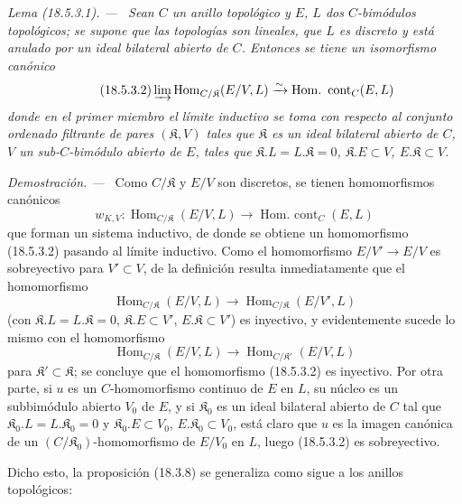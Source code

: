 \documentclass[10pt,oneside]{book}
\makeatletter
\newcommand{\setmanualcurrentlabel}[1]{\def\@currentlabel{#1}}
\newenvironment{lemma}[1][]{%
  \setmanualcurrentlabel{#1}\par\medskip\noindent\itshape Lema (#1). ---\ }{\par}
\newenvironment{proof}{%
  \par\medskip\noindent\textit{Demostración. ---\ }}{\par}
\makeatother
\begin{document}
\begin{lemma}[18.5.3.1]
\label{0.18.5.3.1-es}
Sean $C$ un anillo topológico y $E$, $L$ dos $C$-bimódulos topológicos;
se supone que las topologías son lineales, que $L$ es discreto y está anulado
por un ideal bilateral abierto de $C$. Entonces se tiene un isomorfismo canónico
\begin{equation}
\label{0.18.5.3.2-es}
\tag{18.5.3.2}
  \varinjlim\operatorname{Hom}_{C/\mathfrak K}(E/V,L)
  \xrightarrow{\sim}\operatorname{Hom.\ cont}_C(E,L)
\end{equation}
donde en el primer miembro el límite inductivo se toma con respecto al conjunto
ordenado filtrante de pares $(\mathfrak K,V)$ tales que $\mathfrak K$ es un
ideal bilateral abierto de $C$, $V$ un sub-$C$-bimódulo abierto de $E$, tales que
$\mathfrak K.L=L.\mathfrak K=0$, $\mathfrak K.E\subset V$,
$E.\mathfrak K\subset V$.
\end{lemma}

\begin{proof}
Como $C/\mathfrak K$ y $E/V$ son discretos, se tienen homomorfismos
canónicos
\[
  w_{K,V}:\operatorname{Hom}_{C/\mathfrak K}(E/V,L)
  \longrightarrow\operatorname{Hom.\ cont}_C(E,L)
\]
que forman un sistema inductivo, de donde se obtiene un homomorfismo (18.5.3.2) pasando al
límite inductivo. Como el homomorfismo $E/V'\to E/V$ es sobreyectivo para
$V'\subset V$, de la definición resulta inmediatamente que el homomorfismo
\[
  \operatorname{Hom}_{C/\mathfrak K}(E/V,L)
  \longrightarrow\operatorname{Hom}_{C/\mathfrak K}(E/V',L)
\]
(con $\mathfrak K.L=L.\mathfrak K=0$, $\mathfrak K.E\subset V'$,
$E.\mathfrak K\subset V'$) es inyectivo, y evidentemente sucede lo mismo con
el homomorfismo
\[
  \operatorname{Hom}_{C/\mathfrak K}(E/V,L)
  \longrightarrow\operatorname{Hom}_{C/\mathfrak K'}(E/V,L)
\]
para $\mathfrak K'\subset\mathfrak K$; se concluye que el homomorfismo
(18.5.3.2) es inyectivo. Por otra parte, si $u$ es un $C$-homomorfismo continuo
de $E$ en $L$, su núcleo es un subbimódulo abierto $V_0$ de $E$, y si
$\mathfrak K_0$ es un ideal bilateral abierto de $C$ tal que
$\mathfrak K_0.L=L.\mathfrak K_0=0$ y $\mathfrak K_0.E\subset V_0$,
$E.\mathfrak K_0\subset V_0$, está claro que $u$ es la imagen canónica de un
$(C/\mathfrak K_0)$-homomorfismo de $E/V_0$ en $L$, luego (18.5.3.2) es
sobreyectivo.
\end{proof}

Dicho esto, la proposición (18.3.8) se generaliza como sigue a los anillos
topológicos:
\end{document}
